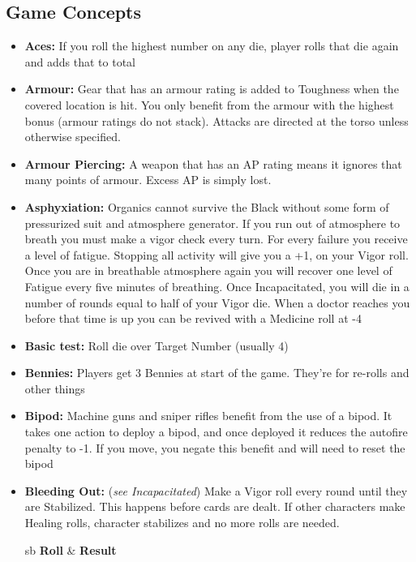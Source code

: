 \subsection{Game Concepts}
\begin{itemize}
  \item \textbf{Aces:} If you roll the highest number on any die, player rolls that die again and adds that to total
  \item \textbf{Armour:} Gear that has an armour rating is added to Toughness when the covered location is hit. You only benefit from the armour with the highest bonus (armour ratings do not stack). Attacks are directed at the torso unless otherwise specified.
  \item \textbf{Armour Piercing:} A weapon that has an AP rating means it ignores that many points of armour. Excess AP is simply lost.
  \item \textbf{Asphyxiation:} Organics cannot survive the Black without some form of pressurized suit and atmosphere generator. If you run out of atmosphere to breath you must make a vigor check every turn. For every failure you receive a level of fatigue. Stopping all activity will give you a +1, on your Vigor roll. Once you are in breathable atmosphere again you will recover one level of Fatigue every five minutes of breathing. Once Incapacitated, you will die in a number of rounds equal to half of your Vigor die. When a doctor reaches you before that time is up you can be revived with a Medicine roll at -4\\
  \item \textbf{Basic test:} Roll die over Target Number (usually 4)
  \item \textbf{Bennies:} Players get 3 Bennies at start of the game. They’re for re-rolls and other things
  \item \textbf{Bipod:} Machine guns and sniper rifles benefit from the use of a bipod. It takes one action to deploy a bipod, and once deployed it reduces the autofire penalty to -1. If you move, you negate this benefit and will need to reset the bipod
  \item \textbf{Bleeding Out:} (\textit{see Incapacitated}) Make a Vigor roll every round until they are Stabilized. This happens before cards are dealt. If other characters make Healing rolls, character stabilizes and no more rolls are needed.
    \begin{redtable}{\linewidth}{sb}
      \textbf{Roll} & \textbf{Result}\\

\end{redtable}
\end{itemize}
